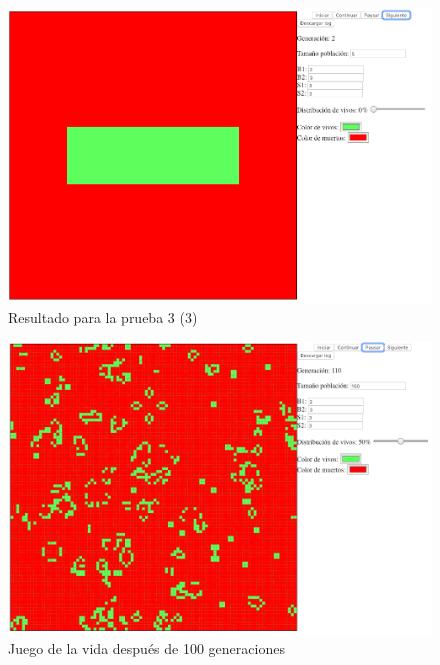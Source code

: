	\begin{figure}[H]
		\begin{center}
			\includegraphics[scale=.3]{GOL/img/test3-3.png}
			\caption{Resultado para la prueba 3 (3)}
			\label{fig:gol5}
		\end{center}
	\end{figure}

	\begin{figure}[H]
		\begin{center}
			\includegraphics[scale=.3]{GOL/img/life1.png}
			\caption{Juego de la vida después de 100 generaciones}
			\label{fig:gol5}
		\end{center}
	\end{figure}

